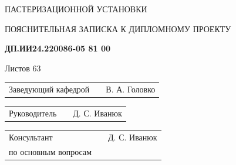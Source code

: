 \begin{titlepage}
\begin{center}
  \par ПАСТЕРИЗАЦИОННОЙ УСТАНОВКИ 

  \par
\end{center}

\vspace{24pt}

\begin{center}
\cyrillicfontsf 
\englishfontsf
\fontsize{12pt}{0pt}\selectfont 
    ПОЯСНИТЕЛЬНАЯ ЗАПИСКА К ДИПЛОМНОМУ ПРОЕКТУ
\end{center}

\vspace{32pt}

\begin{center}
\cyrillicfontsf 
\englishfontsf
\bfseries
\fontsize{16pt}{0pt}\selectfont 
    ДП.ИИ24.220086-05 81 00
\end{center}

\vspace{22pt}

\begin{center}
\cyrillicfontsf 
\englishfontsf
\fontsize{16pt}{0pt}\selectfont 
    Листов 63
\end{center}

\vspace{22pt}

\begin{flushleft}
\cyrillicfontsf 
\englishfontsf
\fontsize{14pt}{0pt}\selectfont 

  \begin{tabular}{p{6.5cm} p{4.767cm} p{5.633cm}}
    \raggedleft Заведующий кафедрой & & В. А. Головко  
  \end{tabular}

  \vspace{14pt}
  
  \begin{tabular}{p{6.5cm} p{4.767cm} p{5.633cm}}
    \raggedleft Руководитель & & Д. С. Иванюк \\ 
  \end{tabular}

  \vspace{14pt}

  \begin{tabular}{p{6.5cm} p{4.767cm} p{5.633cm}}
    \raggedleft Консультант & & Д. С. Иванюк \\
    \raggedleft по основным вопросам & &
  \end{tabular}

  \vspace{14pt}


\end{flushleft}
\end{titlepage}
